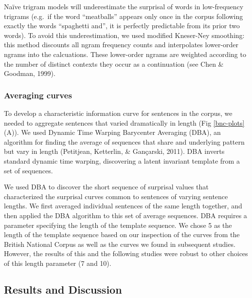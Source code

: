 \documentclass[10pt, letterpaper]{article}
\begin{document}
Naïve trigram models will underestimate the surprisal of words in
low-frequency trigrams (e.g.~if the word ``meatballs'' appears only once
in the corpus following exactly the words ``spaghetti and'', it is
perfectly predictable from its prior two words). To avoid this
underestimation, we used modified Kneser-Ney smoothing: this method
discounts all ngram frequency counts and interpolates lower-order ngrams
into the calcuations. These lower-order ngrams are weighted according to
the number of distinct contexts they occur as a continuation (see Chen
\& Goodman, 1999).

\hypertarget{averaging-curves}{%
\subsubsection{Averaging curves}\label{averaging-curves}}

To develop a characteristic information curve for sentences in the
corpus, we needed to aggregate sentences that varied dramatically in
length (Fig \ref{bnc-plots}(A)). We used Dynamic Time Warping Barycenter
Averaging (DBA), an algorithm for finding the average of sequences that
share and underlying pattern but vary in length (Petitjean, Ketterlin,
\& Gançarski, 2011). DBA inverts standard dynamic time warping,
discovering a latent invariant template from a set of sequences.

We used DBA to discover the short sequence of surprisal values that
characterized the surprisal curves common to sentences of varying
sentence lengths. We first averaged individual sentences of the same
length together, and then applied the DBA algorithm to this set of
average sequences. DBA requires a parameter specifying the length of the
template sequence. We chose 5 as the length of the template sequence
based on our inspection of the curves from the British National Corpus
as well as the curves we found in subsequent studies. However, the
results of this and the following studies were robust to other choices
of this length parameter (7 and 10).

\hypertarget{results-and-discussion}{%
\subsection{Results and Discussion}\label{results-and-discussion}}
\end{document}
